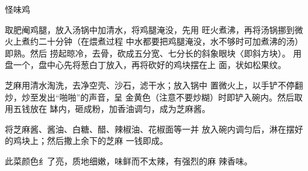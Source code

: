 \begin{recipe}{怪味鸡}

\ingredients


\cooking

\step 取肥阉鸡腿，放入汤锅中加清水，将鸡腿淹没，先用 旺火煮沸，再将汤锅挪到微火上煮约二十分钟（在煨煮过程 中水都要把鸡腿淹没，水不够时可加煮沸的汤）即熟。然后 捞起晾冷，去骨，砍成五分宽、七分长的斜象眼块〈即斜方块）。 用盘一个，盘中心先将葱白丁放入，再将砍好的鸡块摆在上 面，状如松果纹。

\step 芝麻用清水淘洗，去净空壳、沙石，滤干水；放入锅中 置微火上，以手铲不停翻炒，炒至发出“啪啪”的声音，呈 金黄色（注意不要炒糊）时即铲入碗内。然后取用五钱放在 缽内，砸成粉，加香油调匀，成为芝麻酱。

将芝麻酱、酱油、白糖、醋、辣椒油、花椒面等一并 放入碗内调匀后，淋在摆好的鸡块上；然后撒上余下的芝麻 一钱即成。

\notes

此菜颜色纟了亮，质地细嫩，味鲜而不太辣，有强烈的麻 辣香味。

\end{recipe}

